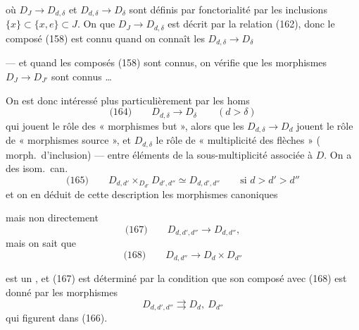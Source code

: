\documentclass[11pt,a4paper]{article}
\begin{document}

où $D_J \to D_{d,\delta}$ et $D_{d,\delta} \to D_\delta$ sont définis par
fonctorialité par les inclusions $\{x\} \subset \{x, e\} \subset J$. On
 \add{\ill{}} que $D_J \to D_{d,\delta}$ est décrit par la relation
(162), donc le composé (158) est connu quand on connaît les $D_{d,\delta} \to D_\delta$

--- et quand les composés (158) sont connus, on vérifie que les morphismes
$D_J \to D_{J'}$ sont connus …

On est donc intéressé plus particulièrement par les homs
\[
  \text{(164)}\qquad D_{d,\delta} \longrightarrow D_\delta \qquad (d > \delta)
\]
qui jouent le rôle des « morphismes but », alors que les $D_{d,\delta} \to D_d$
jouent le rôle de « morphismes source », et $D_{d,\delta}$ le rôle de
« \struck{\ill{}} multiplicité des flèches » ( morph.\ d'inclusion) --- entre
éléments de la sous-multiplicité  associée à $D$.
On a des isom.\ can.
\[
  \text{(165)}\qquad D_{d,d'} \times_{D_{d'}} D_{d',d''} \simeq D_{d,d',d''}
  \qquad \text{si } d > d' > d''
\]
et on en déduit de cette description les morphismes canoniques


mais non directement 
\[
  \text{(167)}\qquad D_{d,d',d''} \longrightarrow D_{d,d''},
\]
mais on sait que
\[
  \text{(168)}\qquad D_{d,d''} \longrightarrow D_d \times D_{d''}
\]

est un , et (167) est déterminé par la condition que son composé avec
(168) est donné par les morphismes
\[
  D_{d,d',d''} \rightrightarrows D_d,\ D_{d''}
\]
qui figurent dans (166).
\end{document}

